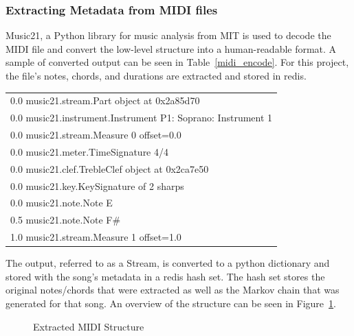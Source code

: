 \documentclass[12pt]{article} %
\begin{document}
\subsubsection{Extracting Metadata from MIDI files}
Music21, a Python library for music analysis from MIT \cite{website:music21} is used to decode the MIDI file and convert the low-level structure into a human-readable format. A sample of converted output can be seen in Table~\ref{midi_encode}. For this project, the file's notes, chords, and durations are extracted and stored in redis.


\begin{center}
  \begin{tabular}{|l|}
    \hline
	{0.0} music21.stream.Part object at 0x2a85d70 \\    
	{0.0} music21.instrument.Instrument P1: Soprano: Instrument 1 \\    
	{0.0} music21.stream.Measure 0 offset=0.0 \\         
	{0.0} music21.meter.TimeSignature 4/4 \\         
	{0.0} music21.clef.TrebleClef object at 0x2ca7e50 \\         
	{0.0} music21.key.KeySignature of 2 sharps \\         
	{0.0} music21.note.Note E \\         
	{0.5} music21.note.Note F\# \\     
	{1.0} music21.stream.Measure 1 offset=1.0 \\
    \hline
  \end{tabular}
\label{midi_encode}
\end{center}

The output, referred to as a Stream, is converted to a python  dictionary and stored with the song's metadata in a redis hash set. The hash set stores the original notes/chords that were extracted as well as the Markov chain that was generated for that song. An overview of the structure can be seen in Figure~\ref{fig:md_kb}.

\begin{figure}[H]
\caption{Extracted MIDI Structure}
\label{fig:md_kb}
\end{figure}
\end{document}
